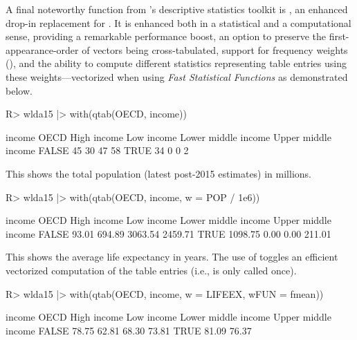 \documentclass[article]{jss} %
\newcommand{\fct}[1]{\code{#1()}}
\begin{document}
A final noteworthy function from 's descriptive statistics toolkit is \fct{qtab}, an enhanced drop-in replacement for \fct{table}. It is enhanced both in a statistical and a computational sense, providing a remarkable performance boost, an option  to preserve the first-appearance-order of vectors being cross-tabulated, support for frequency weights (), and the ability to compute different statistics representing table entries using these weights---vectorized when using \emph{Fast Statistical Functions} as demonstrated below.
%
\begin{Schunk}
\begin{Sinput}
R> wlda15 |> with(qtab(OECD, income))
\end{Sinput}
\begin{Soutput}
       income
OECD    High income Low income Lower middle income Upper middle income
  FALSE          45         30                  47                  58
  TRUE           34          0                   0                   2
\end{Soutput}
\end{Schunk}
This shows the total population (latest post-2015 estimates) in millions.
\begin{Schunk}
\begin{Sinput}
R> wlda15 |> with(qtab(OECD, income, w = POP / 1e6))
\end{Sinput}
\begin{Soutput}
       income
OECD    High income Low income Lower middle income Upper middle income
  FALSE       93.01     694.89             3063.54             2459.71
  TRUE      1098.75       0.00                0.00              211.01
\end{Soutput}
\end{Schunk}
This shows the average life expectancy in years. The use of \fct{fmean} toggles an efficient vectorized computation of the table entries (i.e., \fct{fmean} is only called once).
\begin{Schunk}
\begin{Sinput}
R> wlda15 |> with(qtab(OECD, income, w = LIFEEX, wFUN = fmean))
\end{Sinput}
\begin{Soutput}
       income
OECD    High income Low income Lower middle income Upper middle income
  FALSE       78.75      62.81               68.30               73.81
  TRUE        81.09                                              76.37
\end{Soutput}
\end{Schunk}
\end{document}
